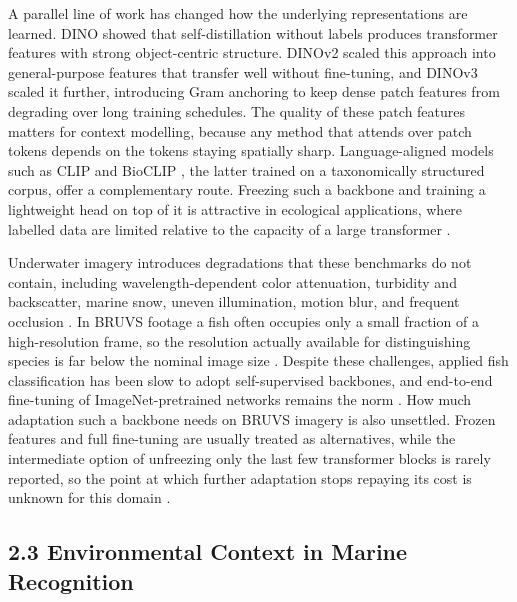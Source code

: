 \documentclass[preprint,12pt]{elsarticle}
\begin{document}
A parallel line of work has changed how the underlying representations
are learned. DINO \cite{ref46} showed that
self-distillation without labels produces transformer features with
strong object-centric structure. DINOv2
\cite{ref47} scaled this approach into
general-purpose features that transfer well without fine-tuning, and
DINOv3 \cite{ref25} scaled it further,
introducing Gram anchoring to keep dense patch features from degrading
over long training schedules. The quality of these patch features
matters for context modelling, because any method that attends over
patch tokens depends on the tokens staying spatially sharp.
Language-aligned models such as CLIP
\cite{ref48} and BioCLIP
\cite{ref49}, the latter trained on a
taxonomically structured corpus, offer a complementary route. Freezing
such a backbone and training a lightweight head on top of it is
attractive in ecological applications, where labelled data are limited
relative to the capacity of a large transformer
\cite{ref50}\cite{ref51}.

Underwater imagery introduces degradations that these benchmarks do not
contain, including wavelength-dependent color attenuation, turbidity and
backscatter, marine snow, uneven illumination, motion blur, and frequent
occlusion \cite{ref8}
\cite{ref11}
\cite{ref52}. In BRUVS footage a fish often
occupies only a small fraction of a high-resolution frame, so the
resolution actually available for distinguishing species is far below
the nominal image size \cite{ref4}
\cite{ref9}. Despite these challenges, applied
fish classification has been slow to adopt self-supervised backbones,
and end-to-end fine-tuning of ImageNet-pretrained networks remains the
norm \cite{ref6}
\cite{ref51}. How much adaptation such a
backbone needs on BRUVS imagery is also unsettled. Frozen features and
full fine-tuning are usually treated as alternatives, while the
intermediate option of unfreezing only the last few transformer blocks
is rarely reported, so the point at which further adaptation stops
repaying its cost is unknown for this domain
\cite{ref51}.

\subsection*{2.3 Environmental Context in Marine
Recognition}\label{environmental-context-in-marine-recognition}
\end{document}
